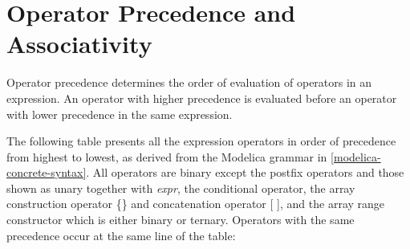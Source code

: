 \section{Operator Precedence and Associativity}

Operator precedence determines the order of evaluation of operators in
an expression. An operator with higher precedence is evaluated before an
operator with lower precedence in the same expression.

The following table presents all the expression operators in order of
precedence from highest to lowest, as derived from the Modelica grammar
in \autoref{modelica-concrete-syntax}. All operators are binary except the postfix operators and
those shown as unary together with \emph{expr}, the conditional
operator, the array construction operator \{\} and concatenation
operator {[} {]}, and the array range constructor which is either binary
  or ternary. Operators with the same precedence occur at the same line of
the table:

